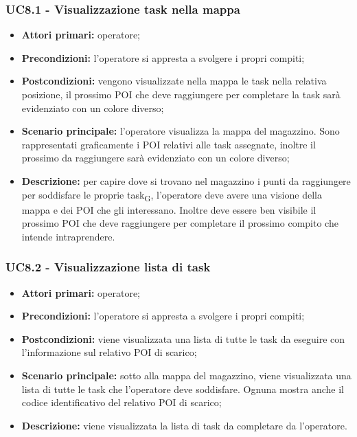 \subsubsection{UC8.1 - Visualizzazione task nella mappa}
\begin{itemize}
	\item 	\textbf{Attori primari:} operatore;
	\item 	\textbf{Precondizioni:} l'operatore si appresta a svolgere i propri compiti;
	\item 	\textbf{Postcondizioni:} vengono visualizzate nella mappa le task nella relativa posizione, il prossimo POI che deve raggiungere per completare la task sarà evidenziato con un colore diverso;
	\item 	\textbf{Scenario principale:} l'operatore visualizza la mappa del magazzino. Sono rappresentati graficamente i POI relativi alle task assegnate, inoltre il prossimo da raggiungere sarà evidenziato con un colore diverso;
	\item 	\textbf{Descrizione:} per capire dove si trovano nel magazzino i punti da raggiungere per soddisfare le proprie task\textsubscript{G}, l'operatore deve avere una visione della mappa e dei POI che gli interessano. Inoltre deve essere ben visibile il prossimo POI che deve raggiungere per completare il prossimo compito che intende intraprendere.
\end{itemize}



\subsubsection{UC8.2 - Visualizzazione lista di task}
\begin{itemize}
	\item 	\textbf{Attori primari:} operatore;
	\item 	\textbf{Precondizioni:} l'operatore si appresta a svolgere i propri compiti;
	\item 	\textbf{Postcondizioni:} viene visualizzata una lista di tutte le task da eseguire con l'informazione sul relativo POI di scarico;
	\item 	\textbf{Scenario principale:} sotto alla mappa del magazzino, viene visualizzata una lista di tutte le task che l'operatore deve soddisfare. Ognuna mostra anche il codice identificativo del relativo POI di scarico;
	\item 	\textbf{Descrizione:} viene visualizzata la lista di task da completare da l'operatore.
\end{itemize}

